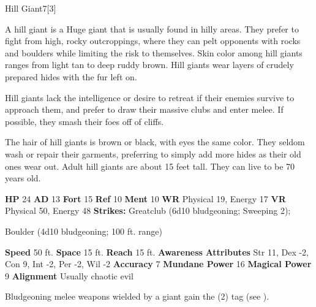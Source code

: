       
  \begin{monsubsection}{Hill Giant}{7}[3]
    \vspace{-1em}\vspace{-1em}
    \vspace{0em}

    
          A hill giant is a Huge giant that is usually found in hilly areas.
          They prefer to fight from high, rocky outcroppings, where they can pelt opponents with rocks and boulders while limiting the risk to themselves.
          Skin color among hill giants ranges from light tan to deep ruddy brown.
          Hill giants wear layers of crudely prepared hides with the fur left on.
        
          Hill giants lack the intelligence or desire to retreat if their enemies survive to approach them, and prefer to draw their massive clubs and enter melee.
          If possible, they smash their foes off of cliffs.

          The hair of hill giants is brown or black, with eyes the same color.
          They seldom wash or repair their garments, preferring to simply add more hides as their old ones wear out.
          Adult hill giants are about 15 feet tall.
          They can live to be 70 years old.
        

    \begin{spellcontent}
      \begin{spelltargetinginfo}
        \pari \textbf{HP} 24 \monsep
          \textbf{AD} 13 \monsep
          \textbf{Fort} 15 \monsep
          \textbf{Ref} 10 \monsep
          \textbf{Ment} 10
        \pari \textbf{WR} Physical 19, Energy 17 \monsep
        \textbf{VR} Physical 50, Energy 48
        \pari \textbf{Strikes:}
            Greatclub  (6d10 bludgeoning; Sweeping 2);
\par Boulder  (4d10 bludgeoning; 100 ft. range)
      \end{spelltargetinginfo}
    \end{spellcontent}
    \begin{monsterfooter}
      \pari \textbf{Speed} 50 ft. \monsep
        \textbf{Space} 15 ft. \monsep
        \textbf{Reach} 15 ft.
      \pari \textbf{Awareness} 
      \pari \textbf{Attributes}
        Str 11, Dex -2,
        Con 9, Int -2,
        Per -2, Wil -2
      \pari \textbf{Accuracy} 7 \monsep
        \textbf{Mundane Power} 16 \monsep
      \textbf{Magical Power} 9
      \pari \textbf{Alignment} Usually chaotic evil
    \end{monsterfooter}
  \end{monsubsection}
        Bludgeoning melee weapons wielded by a giant gain the  (2) tag (see ).
      
